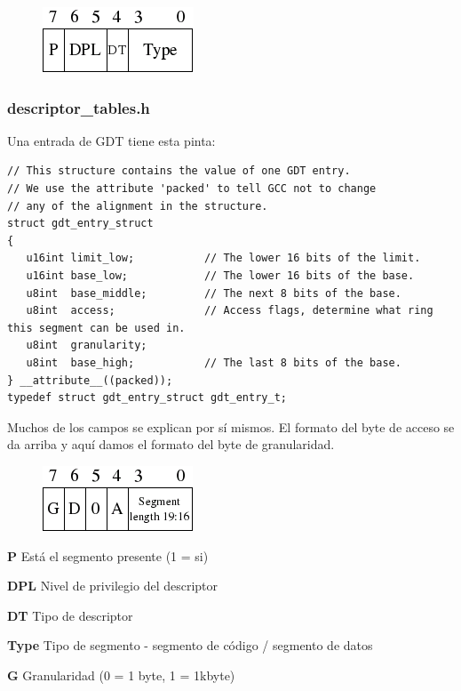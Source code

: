 \documentclass{report}
\begin{document}
\begin{figure}[htb]
\centering
\includegraphics[scale=0.5]{gdt_idt_gdt_format_2.png}
\end{figure}

\subsubsection{descriptor\_tables.h}

Una entrada de GDT tiene esta pinta:

\begin{lstlisting}
// This structure contains the value of one GDT entry.
// We use the attribute 'packed' to tell GCC not to change
// any of the alignment in the structure.
struct gdt_entry_struct
{
   u16int limit_low;           // The lower 16 bits of the limit.
   u16int base_low;            // The lower 16 bits of the base.
   u8int  base_middle;         // The next 8 bits of the base.
   u8int  access;              // Access flags, determine what ring this segment can be used in.
   u8int  granularity;
   u8int  base_high;           // The last 8 bits of the base.
} __attribute__((packed));
typedef struct gdt_entry_struct gdt_entry_t;
\end{lstlisting}

Muchos de los campos se explican por sí mismos. El formato del byte de acceso se da arriba y aquí damos el formato del byte de granularidad.

\begin{figure}[htb]
\centering
\includegraphics[scale=0.5]{gdt_idt_gdt_format_1.png}
\end{figure}

\textbf{P} Está el segmento presente (1 = si)

\textbf{DPL} Nivel de privilegio del descriptor

\textbf{DT} Tipo de descriptor

\textbf{Type} Tipo de segmento - segmento de código / segmento de datos

\textbf{G} Granularidad (0 = 1 byte, 1 = 1kbyte)
\end{document}
